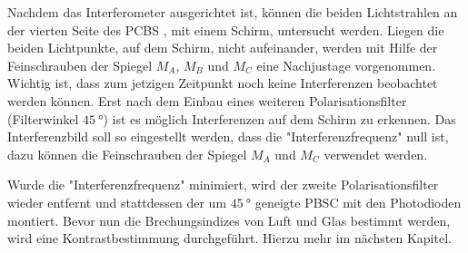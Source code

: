 Nachdem das Interferometer ausgerichtet ist, können die beiden Lichtstrahlen an der vierten Seite des PCBS
, mit einem Schirm, untersucht werden.
Liegen die beiden Lichtpunkte, auf dem Schirm, nicht aufeinander, werden mit Hilfe der
Feinschrauben der Spiegel $M_A$, $M_B$ und $M_C$ eine Nachjustage vorgenommen. Wichtig ist, dass zum
jetzigen Zeitpunkt noch keine Interferenzen beobachtet werden können. Erst nach
dem Einbau eines weiteren Polarisationsfilter (Filterwinkel $\SI{45}{\degree}$)
ist es möglich Interferenzen auf dem Schirm zu erkennen.
Das Interferenzbild soll so eingestellt werden, dass die
"Interferenzfrequenz" null ist, dazu können die Feinschrauben der Spiegel
$M_A$ und $M_C$ verwendet werden.

Wurde die "Interferenzfrequenz" minimiert, wird der zweite Polarisationsfilter wieder
entfernt und stattdessen der um $\SI{45}{\degree}$ geneigte PBSC mit den Photodioden
montiert. Bevor nun die Brechungsindizes von Luft und Glas bestimmt werden, wird eine
Kontrastbestimmung durchgeführt. Hierzu mehr im nächsten Kapitel.

